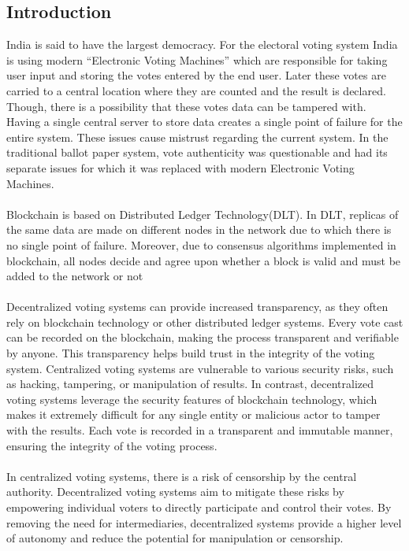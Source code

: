 \documentclass[oneside, 12pt]{book}
\begin{document}
		\subsection{Introduction}
			India is said to have the largest democracy. For the electoral voting system India is using modern “Electronic Voting Machines” which are responsible for taking user input and storing the votes entered by the end user. Later these votes are carried to a central location where they are counted and the result is declared. Though, there is a possibility that these votes data can be tampered with. Having a single central server to store data creates a single point of failure for the entire system. These issues cause mistrust regarding the current system. In the traditional ballot paper system, vote authenticity was questionable and had its separate issues for which it was replaced with modern Electronic Voting Machines.
			\\\\Blockchain is based on Distributed Ledger Technology(DLT). In DLT, replicas of the same data are made on different nodes in the network due to which there is no single point of failure. Moreover, due to consensus algorithms implemented in blockchain, all nodes decide and agree upon whether a block is valid and must be added to the network or not
			\\\\Decentralized voting systems can provide increased transparency, as they often rely on blockchain technology or other distributed ledger systems. Every vote cast can be recorded on the blockchain, making the process transparent and verifiable by anyone. This transparency helps build trust in the integrity of the voting system.  Centralized voting systems are vulnerable to various security risks, such as hacking, tampering, or manipulation of results. In contrast, decentralized voting systems leverage the security features of blockchain technology, which makes it extremely difficult for any single entity or malicious actor to tamper with the results. Each vote is recorded in a transparent and immutable manner, ensuring the integrity of the voting process.
			\\\\In centralized voting systems, there is a risk of censorship by the central authority. Decentralized voting systems aim to mitigate these risks by empowering individual voters to directly participate and control their votes. By removing the need for intermediaries, decentralized systems provide a higher level of autonomy and reduce the potential for manipulation or censorship.
\end{document}
